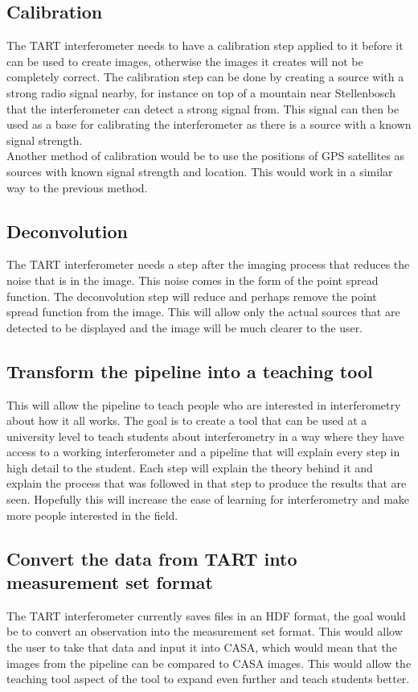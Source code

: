 \subsection{Calibration}
The TART interferometer needs to have a calibration step applied to it before it can be used to create images, otherwise the images it creates will not be completely correct. The calibration step can be done by creating a source with a strong radio signal nearby, for instance on top of a mountain near Stellenbosch that the interferometer can detect a strong signal from. This signal can then be used as a base for calibrating the interferometer as there is a source with a known signal strength.\\
Another method of calibration would be to use the positions of GPS satellites as sources with known signal strength and location\cite{CALIBRATION_TART}. This would work in a similar way to the previous method. 
\subsection{Deconvolution}
The TART interferometer needs a step after the imaging process that reduces the noise that is in the image. This noise comes in the form of the point spread function. The deconvolution step will reduce and perhaps remove the point spread function from the image. This will allow only the actual sources that are detected to be displayed and the image will be much clearer to the user.
\subsection{Transform the pipeline into a teaching tool}
This will allow the pipeline to teach people who are interested in interferometry about how it all works. 
The goal is to create a tool that can be used at a university level to teach students about interferometry in a way where they have access to a working interferometer and a pipeline that will explain every step in high detail to the student. Each step will explain the theory behind it and explain the process that was followed in that step to produce the results that are seen. Hopefully this will increase the ease of learning for interferometry and make more people interested in the field.
\subsection{Convert the data from TART into measurement set format}
The TART interferometer currently saves files in an HDF format, the goal would be to convert an observation into the measurement set format. This would allow the user to take that data and input it into CASA\cite{CASA}, which would mean that the images from the pipeline can be compared to CASA images. This would allow the teaching tool aspect of the tool to expand even further and teach students better. 